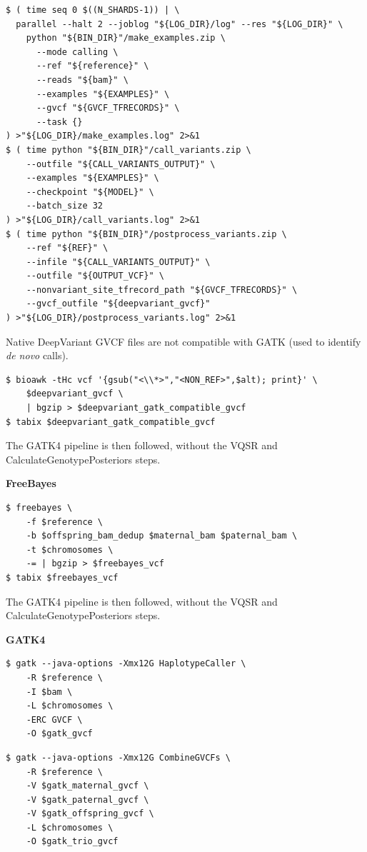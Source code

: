 \documentclass{article}
\begin{document}
\begin{lstlisting}
$ ( time seq 0 $((N_SHARDS-1)) | \
  parallel --halt 2 --joblog "${LOG_DIR}/log" --res "${LOG_DIR}" \
    python "${BIN_DIR}"/make_examples.zip \
      --mode calling \
      --ref "${reference}" \
      --reads "${bam}" \
      --examples "${EXAMPLES}" \
      --gvcf "${GVCF_TFRECORDS}" \
      --task {}
) >"${LOG_DIR}/make_examples.log" 2>&1
$ ( time python "${BIN_DIR}"/call_variants.zip \
    --outfile "${CALL_VARIANTS_OUTPUT}" \
    --examples "${EXAMPLES}" \
    --checkpoint "${MODEL}" \
    --batch_size 32
) >"${LOG_DIR}/call_variants.log" 2>&1
$ ( time python "${BIN_DIR}"/postprocess_variants.zip \
    --ref "${REF}" \
    --infile "${CALL_VARIANTS_OUTPUT}" \
    --outfile "${OUTPUT_VCF}" \
    --nonvariant_site_tfrecord_path "${GVCF_TFRECORDS}" \
    --gvcf_outfile "${deepvariant_gvcf}"
) >"${LOG_DIR}/postprocess_variants.log" 2>&1
\end{lstlisting}

Native DeepVariant GVCF files are not compatible with GATK (used to identify \textit{de novo} calls).

\begin{lstlisting}
$ bioawk -tHc vcf '{gsub("<\\*>","<NON_REF>",$alt); print}' \
    $deepvariant_gvcf \
    | bgzip > $deepvariant_gatk_compatible_gvcf
$ tabix $deepvariant_gatk_compatible_gvcf
\end{lstlisting}

The GATK4 pipeline is then followed, without the VQSR and CalculateGenotypePosteriors steps.

\noindent \textbf{FreeBayes}

\begin{lstlisting}
$ freebayes \
    -f $reference \
    -b $offspring_bam_dedup $maternal_bam $paternal_bam \
    -t $chromosomes \
    -= | bgzip > $freebayes_vcf
$ tabix $freebayes_vcf
\end{lstlisting}

The GATK4 pipeline is then followed, without the VQSR and CalculateGenotypePosteriors steps.

\noindent \textbf{GATK4}

\begin{lstlisting}
$ gatk --java-options -Xmx12G HaplotypeCaller \
    -R $reference \
    -I $bam \
    -L $chromosomes \
    -ERC GVCF \
    -O $gatk_gvcf
\end{lstlisting}

\begin{lstlisting}
$ gatk --java-options -Xmx12G CombineGVCFs \
    -R $reference \
    -V $gatk_maternal_gvcf \
    -V $gatk_paternal_gvcf \
    -V $gatk_offspring_gvcf \
    -L $chromosomes \
    -O $gatk_trio_gvcf
\end{lstlisting}
\end{document}
